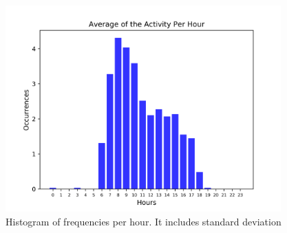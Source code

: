 \documentclass[11pt,fleqn]{book} %
\begin{document}
%


\begin{figure}[h!]%
\centering%
\includegraphics[width=400px]{Pictures/Morelia Hive 1histogramClean.png}%
\caption{Histogram of frequencies per hour. It includes standard deviation}%
\end{figure}
\end{document}
